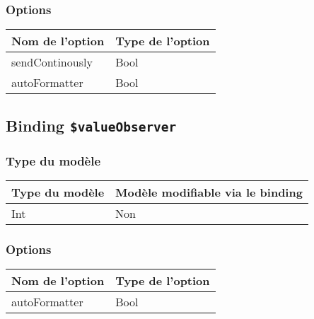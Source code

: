 \subsubsection{Options}

\begin{tabular}{|l|l|}
\hline
\textbf{Nom de l'option} & \textbf{Type de l'option}\\
\hline
sendContinously & Bool\\
\hline
autoFormatter & Bool\\
\hline
\end{tabular}








\subsection{Binding \texttt{\$valueObserver}}

\subsubsection{Type du modèle}

\begin{tabular}{|l|l|}
\hline
\textbf{Type du modèle} & \textbf{Modèle modifiable via le binding}\\
\hline
Int & Non\\
\hline
\end{tabular}
\subsubsection{Options}

\begin{tabular}{|l|l|}
\hline
\textbf{Nom de l'option} & \textbf{Type de l'option}\\
\hline
autoFormatter & Bool\\
\hline
\end{tabular}















